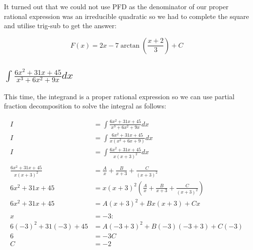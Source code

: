 \documentclass[12pt]{article}
\begin{document}
It turned out that we could not use PFD as the denominator of our proper rational expression was an irreducible quadratic so we had to complete the square and utilise trig-sub to get the answer:

$$
    F(x) = 2x - 7\arctan\left(\frac{x+2}{3}\right) + C
$$

\subsection{$\int \frac{6x^2+31x+45}{x^3+6x^2+9x} dx$}

This time, the integrand is a proper rational expression so we can use partial fraction decomposition to solve the integral as follows:


\begin{align}
    I                            & = \int \frac{6x^2+31x+45}{x^3+6x^2+9x} dx                                 \\
    I                            & = \int \frac{6x^2+31x+45}{x(x^2+6x+9)} dx                                 \\
    I                            & = \int \frac{6x^2+31x+45}{x(x+3)^2} dx                                    \\
    \nonumber                                                                                                \\
    \frac{6x^2+31x+45}{x(x+3)^2} & = \frac{A}{x} + \frac{B}{x+3} + \frac{C}{(x+3)^2}                         \\
    6x^2+31x+45                  & = x(x+3)^2\left(\frac{A}{x} + \frac{B}{x+3} + \frac{C}{(x+3)^2}\right)    \\
    6x^2+31x+45                  & = A(x+3)^2 + Bx(x+3) + Cx                                                 \\
    \nonumber                                                                                                \\
    x                            & =-3:                                                                      \\
    6(-3)^2+31(-3)+45            & = A(-3+3)^2 + B(-3)(-3+3) + C(-3)                                         \\
    6                            & = -3C                                                                     \\
    C                            & = -2                                                                      \\

\end{align}
\end{document}
